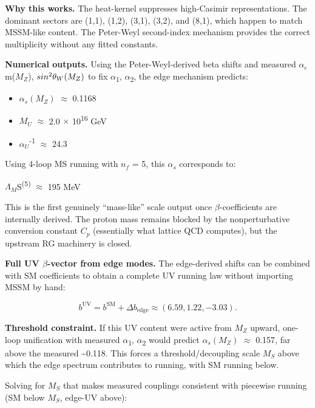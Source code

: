 \documentclass[11pt,a4paper]{article}
\theoremstyle{remark}
\providecommand{\tightlist}{%
  \setlength{\itemsep}{0pt}\setlength{\parskip}{0pt}}
\begin{document}
\textbf{Why this works.} The heat-kernel suppresses high-Casimir representations. The dominant sectors are (1,1), (1,2), (3,1), (3,2), and (8,1), which happen to match MSSM-like content. The Peter-Weyl second-index mechanism provides the correct multiplicity without any fitted constants.

\textbf{Numerical outputs.} Using the Peter-Weyl-derived beta shifts and measured \(\ensuremath{\alpha}_e\)m(\(M_Z\)), \(sin\textsuperscript{2}\ensuremath{\theta}_W(M_Z)\) to fix \ensuremath{\alpha}\textsubscript{1}, \ensuremath{\alpha}\textsubscript{2}, the edge mechanism predicts:

\begin{itemize}
\tightlist
\item
  \(\ensuremath{\alpha}_s(M_Z)\) \ensuremath{\approx} 0.1168
\item
  \(M_U\) \ensuremath{\approx} 2.0 \ensuremath{\times} 10\textsuperscript{16} GeV
\item
  \(\ensuremath{\alpha}_U\)\textsuperscript{-1} \ensuremath{\approx} 24.3
\end{itemize}

Using 4-loop MS running with \(n_f\) = 5, this \(\ensuremath{\alpha}_s\) corresponds to:

\(\ensuremath{\Lambda}_M\)S\textsuperscript{(5)} \ensuremath{\approx} 195 MeV

This is the first genuinely ``mass-like'' scale output once \ensuremath{\beta}-coefficients are
internally derived. The proton mass remains blocked by the nonperturbative
conversion constant \(C_p\) (essentially what lattice QCD computes), but the
upstream RG machinery is closed.

\textbf{Full UV \ensuremath{\beta}-vector from edge modes.} The edge-derived shifts can be combined with SM coefficients to obtain a complete UV running law without importing MSSM by hand:

\[
b^\mathrm{UV} = b^\mathrm{SM} + \Delta b_\mathrm{edge} \approx (6.59, 1.22, -3.03).
\]

\textbf{Threshold constraint.} If this UV content were active from \(M_Z\) upward, one-loop unification with measured \ensuremath{\alpha}\textsubscript{1}, \ensuremath{\alpha}\textsubscript{2} would predict \(\ensuremath{\alpha}_s(M_Z)\) \ensuremath{\approx} 0.157, far above the measured \textasciitilde0.118. This forces a threshold/decoupling scale \(M_S\) above which the edge spectrum contributes to running, with SM running below.

Solving for \(M_S\) that makes measured couplings consistent with piecewise running (SM below \(M_S\), edge-UV above):
\end{document}
